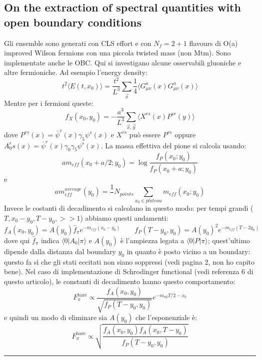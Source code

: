\documentclass[12pt,a4paper,openright]{article}
\newcommand{\la}{\langle}
\newcommand{\ra}{\rangle}
\newcommand{\bare}{^{\text{bare}}}
\begin{document}
\subsection{On the extraction of spectral quantities with open boundary conditions}
Gli ensemble sono generati con CLS effort e con $N_f = 2+1$ flavours di O(a) improved Wilson fermions con una piccola twisted mass (non Mtm).
Sono implementate anche le OBC.
\newline
Qui si investigano alcune osservabili gluoniche e altre fermioniche. Ad esempio l'energy density:
\begin{equation*}
  t^2 \la E(t, x_0) \ra = \frac{t^2}{L^3} \sum_{\vec x} \frac{1}{4} \la G_{\mu\nu}^a (x) G_{\mu\nu}^a (x) \ra
\end{equation*} 
Mentre per i fermioni queste:
\begin{equation*}
  f_X(x_0,y_0) = -\frac{a^3}{L^3} \sum_{\vec x, \vec y} \la X^{rs} (x) P^{sr} (y) \ra
\end{equation*}
dove $P^{rs} (x) = \bar \psi^r (x) \gamma_5 \psi^s(x)$ e $X^{rs}$ può essere $P^{rs}$ oppure $A_0^rs (x) = \bar \psi^r (x) \gamma_0\gamma_5 \psi^s(x)$.
La massa effettiva del pione si calcola usando:
\begin{equation*}
  am_{eff} (x_0 +a/2;y_0) = \log \frac{f_P(x_0;y_0)}{f_P(x_0+a;y_0)}
\end{equation*}
e
\begin{equation*}
  am_{eff}^{average}(y_0) = \frac{1}{}N_{points} \sum_{x_0 \in plateau} m_{eff} (x_0;y_0)
\end{equation*}
Invece le costanti di decadimento si calcolano in questo modo: per tempi grandi ($T, x_0-y_0, T-y_0, >> 1$) abbiamo questi andamenti:
\begin{equation*}
  f_A (x_0,y_0) = A(y_0) \hat f_\pi e^{-m_{eff} (x_0-y_0)} \quad \quad f_P (T-y_0,y_0) = A(y_0)^2  e^{-m_{eff} (T-2y_0)}
\end{equation*}
dove qui $\hat f_\pi$ indica $\la 0 | A_0 | \pi \ra$ e $A(y_0)$ è l'ampiezza legata a $\la 0 | P | \pi \ra$;
quest'ultimo dipende dalla distanza dal boundary $y_0$ in quanto è posto vicino a un boundary: questo fa sì che gli stati eccitati non siano soppressi (vedi pagina 2, non ho capito bene).
\newline
Nel caso di implementazione di Schrodinger functional (vedi referenza 6 di questo articolo), le constanti di decadimento hanno questo comportamento:
\begin{equation}
  F_{\pi}\bare \propto \frac{f_A (x_0,y_0)}{\sqrt{f_P(T-y_0,y_0)}}e^{-m_{\text{eff}}T/2 - x_0}
\end{equation}
e quindi un modo di eliminare sia $A(y_0)$ che l'esponenziale è:
\begin{equation}
  F_{\pi}\bare \propto \sqrt{\frac{f_A (x_0,y_0) f_A (x_0,T-y_0)}{f_P(T-y_0,y_0)}}  
\end{equation}
\newline
\hrule
\end{document}
